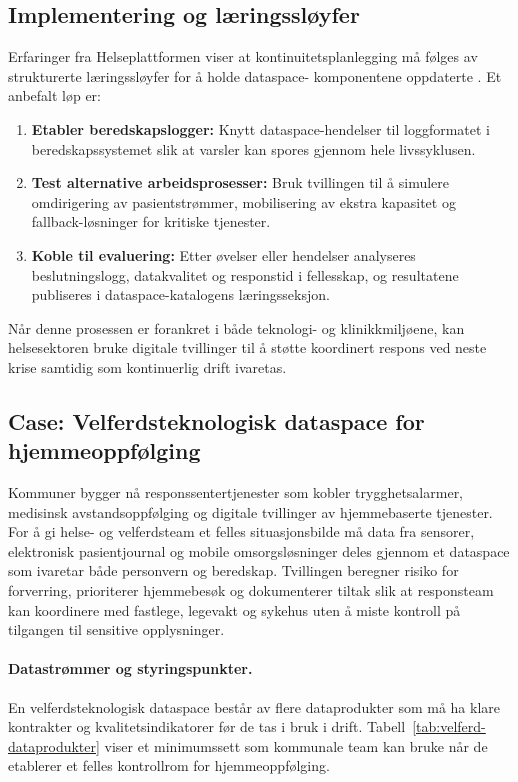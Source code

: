 \subsection{Implementering og læringssløyfer}
Erfaringer fra Helseplattformen viser at kontinuitetsplanlegging må følges av strukturerte læringssløyfer for å holde dataspace-
komponentene oppdaterte \citep{helseplattformen2023kontinuitet}. Et anbefalt løp er:
\begin{enumerate}
    \item \textbf{Etabler beredskapslogger:} Knytt dataspace-hendelser til loggformatet i beredskapssystemet slik at varsler kan
    spores gjennom hele livssyklusen.
    \item \textbf{Test alternative arbeidsprosesser:} Bruk tvillingen til å simulere omdirigering av pasientstrømmer, mobilisering
    av ekstra kapasitet og fallback-løsninger for kritiske tjenester.
    \item \textbf{Koble til evaluering:} Etter øvelser eller hendelser analyseres beslutningslogg, datakvalitet og responstid i
    fellesskap, og resultatene publiseres i dataspace-katalogens læringsseksjon.
\end{enumerate}
Når denne prosessen er forankret i både teknologi- og klinikkmiljøene, kan helsesektoren bruke digitale tvillinger til å støtte
koordinert respons ved neste krise samtidig som kontinuerlig drift ivaretas.

\subsection{Case: Velferdsteknologisk dataspace for hjemmeoppfølging}
Kommuner bygger nå responssentertjenester som kobler trygghetsalarmer, medisinsk avstandsoppfølging og digitale tvillinger av hjemmebaserte tjenester.\citep{helsedir2020dho} For å gi helse- og velferdsteam et felles situasjonsbilde må data fra sensorer, elektronisk pasientjournal og mobile omsorgsløsninger deles gjennom et dataspace som ivaretar både personvern og beredskap.\citep{ks2024responssenter} Tvillingen beregner risiko for forverring, prioriterer hjemmebesøk og dokumenterer tiltak slik at responsteam kan koordinere med fastlege, legevakt og sykehus uten å miste kontroll på tilgangen til sensitive opplysninger.\citep{nhn2024dataspace}

\paragraph{Datastrømmer og styringspunkter.} En velferdsteknologisk dataspace består av flere dataprodukter som må ha klare kontrakter og kvalitetsindikatorer før de tas i bruk i drift. Tabell~\ref{tab:velferd-dataprodukter} viser et minimumssett som kommunale team kan bruke når de etablerer et felles kontrollrom for hjemmeoppfølging.

